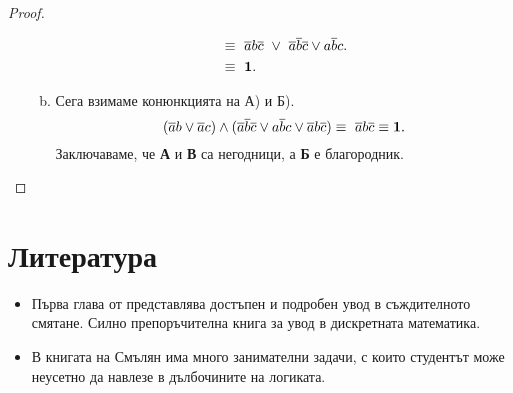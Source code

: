 \begin{proof}
\begin{enumerate}[a)]
\begin{enumerate}[a)]
\begin{align*}
        & \equiv\ \overline{a}b\overline{c}\ \vee\ \overline{a}\overline{b}\overline{c} \vee  a\overline{b}c.\\
        & \equiv\ \mathbf{1}. 
      \end{align*}
    \item
      Сега взимаме конюнкцията на А) и Б).
      \[(\overline{a}b \vee \overline{a}c)\wedge (\overline{a}\overline{b}\overline{c} \vee  a\overline{b}c \vee \overline{a}b\overline{c}) \equiv\ \overline{a}b\overline{c} \equiv {\mathbf 1}.\]
      Заключаваме, че {\bf А} и {\bf В} са негодници, а {\bf Б} е благородник.
    \end{enumerate}
  \end{enumerate}
\end{proof}

\section*{Литература}

\begin{itemize}
\item
  Първа глава от \cite{rosen} представлява достъпен и подробен увод в съждителното смятане.
  Силно препоръчителна книга за увод в дискретната математика.
\item 
  В книгата на Смълян \cite{smullyan} има много занимателни задачи, с които 
  студентът може неусетно да навлезе в дълбочините на логиката.
\end{itemize}

